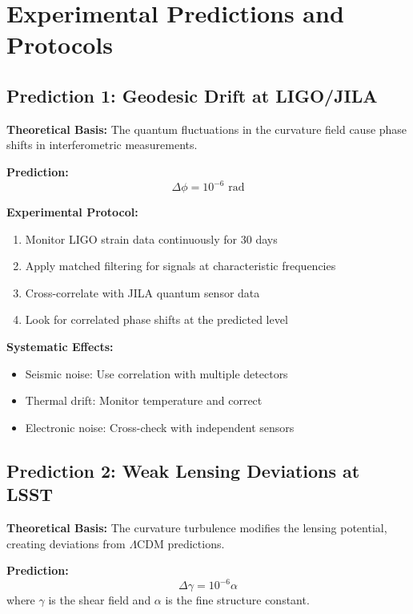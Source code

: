 \documentclass[11pt]{article}
\newcommand{\lamcdm}{$\Lambda$CDM}
\begin{document}
\section{Experimental Predictions and Protocols}

\subsection{Prediction 1: Geodesic Drift at LIGO/JILA}

\textbf{Theoretical Basis:}
The quantum fluctuations in the curvature field cause phase shifts in interferometric measurements.

\textbf{Prediction:}
\begin{equation}
\Delta\phi = 10^{-6} \text{ rad}
\end{equation}

\textbf{Experimental Protocol:}
\begin{enumerate}
\item Monitor LIGO strain data continuously for 30 days
\item Apply matched filtering for signals at characteristic frequencies
\item Cross-correlate with JILA quantum sensor data
\item Look for correlated phase shifts at the predicted level
\end{enumerate}

\textbf{Systematic Effects:}
\begin{itemize}
\item Seismic noise: Use correlation with multiple detectors
\item Thermal drift: Monitor temperature and correct
\item Electronic noise: Cross-check with independent sensors
\end{itemize}

\subsection{Prediction 2: Weak Lensing Deviations at LSST}

\textbf{Theoretical Basis:}
The curvature turbulence modifies the lensing potential, creating deviations from \lamcdm{} predictions.

\textbf{Prediction:}
\begin{equation}
\Delta\gamma = 10^{-6}\alpha
\end{equation}
where $\gamma$ is the shear field and $\alpha$ is the fine structure constant.
\end{document}
